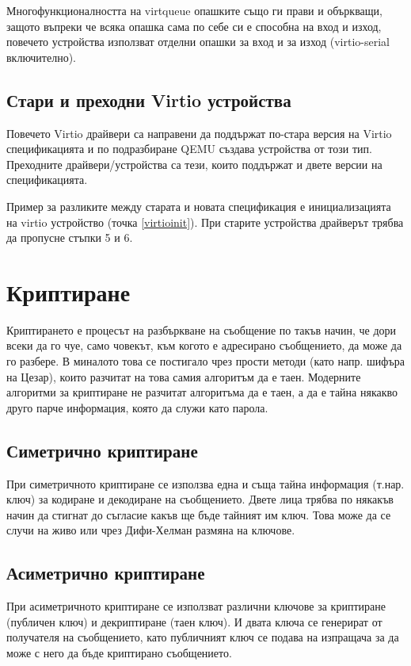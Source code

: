   Многофункционалността на virtqueue опашките също ги прави и объркващи, защото въпреки че всяка опашка сама по себе си е способна на вход и изход, повечето устройства използват отделни опашки за вход и за изход (virtio-serial включително).

  \subsection{Стари и преходни Virtio устройства}
  Повечето Virtio драйвери са направени да поддържат по-стара версия на Virtio спецификацията и по подразбиране QEMU създава устройства от този тип. Преходните драйвери/устройства са тези, които поддържат и двете версии на спецификацията.

  Пример за разликите между старата и новата спецификация е инициализацията на virtio устройство (точка \ref{virtioinit}). При старите устройства драйверът трябва да пропусне стъпки 5 и 6.

\section{Криптиране}
Криптирането е процесът на разбъркване на съобщение по такъв начин, че дори всеки да го чуе, само човекът, към когото е адресирано съобщението, да може да го разбере. В миналото това се постигало чрез прости методи (като напр. шифъра на Цезар), които разчитат на това самия алгоритъм да е таен. Модерните алгоритми за криптиране не разчитат алгоритъма да е таен, а да е тайна някакво друго парче информация, която да служи като парола.

  \subsection{Симетрично криптиране}
  При симетричното криптиране се използва една и съща тайна информация (т.нар. ключ) за кодиране и декодиране на съобщението. Двете лица трябва по някакъв начин да стигнат до съгласие какъв ще бъде тайният им ключ. Това може да се случи на живо или чрез Дифи-Хелман размяна на ключове.


  \subsection{Асиметрично криптиране}
  При асиметричното криптиране се използват различни ключове за криптиране (публичен ключ) и декриптиране (таен ключ). И двата ключа се генерират от получателя на съобщението, като публичният ключ се подава на изпращача за да може с него да бъде криптирано съобщението.

